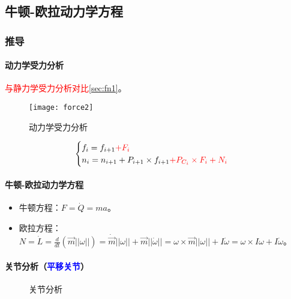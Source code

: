 \documentclass[
12pt, %
a4paper, 
oneside, %
headinclude,footinclude, %
]{scrartcl}
\begin{document}
\subsection[牛顿-欧拉动力学方程]{牛顿-欧拉动力学方程}
\subsubsection[推导]{推导}
\paragraph{动力学受力分析}\label{sec:fn2}
\textcolor{red}{与静力学受力分析对比}\ref{sec:fn1}。 \\
\begin{minipage}{0.3\textwidth}
\begin{figure}[H]
\centering 
\texttt{[image: force2]} 
\caption{动力学受力分析}
\end{figure}
\end{minipage}
\begin{minipage}{0.7\textwidth}
$$ \begin{cases} f_i = f_{i + 1} \textcolor{red}{+ F_i} \\ n_i = n_{i + 1} + P_{i + 1} \times f_{i + 1} \textcolor{red}{+ P_{C_i} \times F_i + N_i} \end{cases} $$
\end{minipage}
\paragraph{牛顿-欧拉动力学方程}
\begin{itemize}
\item 牛顿方程：$ F = \dot{Q} = ma $。
\item 欧拉方程：$ N = \dot{L} = \frac{d}{dt}(\vec{m}||\omega||) = \dot{\vec{m}}||\omega|| + \vec{m}||\dot{\omega}|| = \omega \times \vec{m}||\omega|| + I \dot{\omega} = \omega \times I \omega + I \dot{\omega} $。
\end{itemize}
\paragraph{关节分析（\textcolor{blue}{平移关节}）}
\begin{figure}[H]
\centering
{} \quad
{}
\caption{关节分析}
\end{figure}
\end{document}
